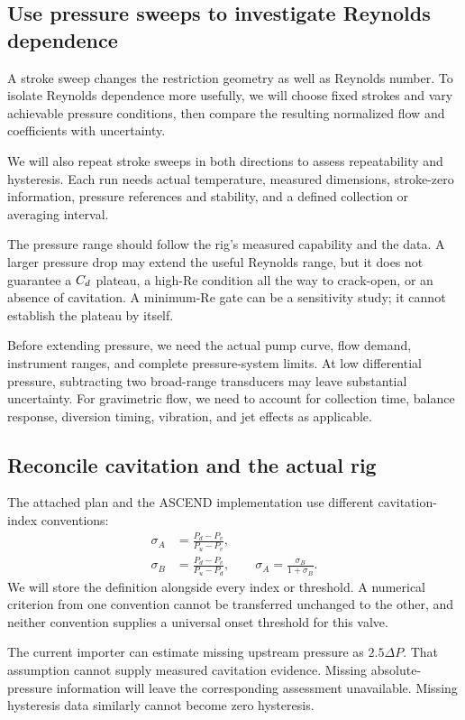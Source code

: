 \subsection{Use pressure sweeps to investigate Reynolds dependence}

A stroke sweep changes the restriction geometry as well as Reynolds number. To isolate Reynolds dependence more usefully, we will choose fixed strokes and vary achievable pressure conditions, then compare the resulting normalized flow and coefficients with uncertainty.

We will also repeat stroke sweeps in both directions to assess repeatability and hysteresis. Each run needs actual temperature, measured dimensions, stroke-zero information, pressure references and stability, and a defined collection or averaging interval.

The pressure range should follow the rig's measured capability and the data. A larger pressure drop may extend the useful Reynolds range, but it does not guarantee a $C_d$ plateau, a high-Re condition all the way to crack-open, or an absence of cavitation. A minimum-Re gate can be a sensitivity study; it cannot establish the plateau by itself.

Before extending pressure, we need the actual pump curve, flow demand, instrument ranges, and complete pressure-system limits. At low differential pressure, subtracting two broad-range transducers may leave substantial uncertainty. For gravimetric flow, we need to account for collection time, balance response, diversion timing, vibration, and jet effects as applicable.

\subsection{Reconcile cavitation and the actual rig}

The attached plan and the ASCEND implementation use different cavitation-index conventions:
\begin{align}
\sigma_A&=\frac{P_d-P_v}{P_u-P_v},\\
\sigma_B&=\frac{P_d-P_v}{P_u-P_d},
\qquad
\sigma_A=\frac{\sigma_B}{1+\sigma_B}.
\end{align}
We will store the definition alongside every index or threshold. A numerical criterion from one convention cannot be transferred unchanged to the other, and neither convention supplies a universal onset threshold for this valve.

The current importer can estimate missing upstream pressure as $2.5\Delta P$. That assumption cannot supply measured cavitation evidence. Missing absolute-pressure information will leave the corresponding assessment unavailable. Missing hysteresis data similarly cannot become zero hysteresis.

